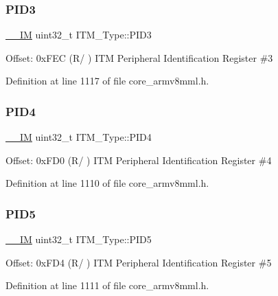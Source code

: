 \mbox{\label{struct_i_t_m___type_af317d5e2d946d70e6fb67c02b92cc8a3}} 
\subsubsection{\texorpdfstring{P\+I\+D3}{PID3}}
{\footnotesize\ttfamily \hyperlink{core__sc300_8h_a4cc1649793116d7c2d8afce7a4ffce43}{\+\_\+\+\_\+\+IM} uint32\+\_\+t I\+T\+M\+\_\+\+Type\+::\+P\+I\+D3}

Offset\+: 0x\+F\+EC (R/ ) I\+TM Peripheral Identification Register \#3 

Definition at line 1117 of file core\+\_\+armv8mml.\+h.

\mbox{\label{struct_i_t_m___type_aad5e11dd4baf6d941bd6c7450f60a158}} 
\subsubsection{\texorpdfstring{P\+I\+D4}{PID4}}
{\footnotesize\ttfamily \hyperlink{core__sc300_8h_a4cc1649793116d7c2d8afce7a4ffce43}{\+\_\+\+\_\+\+IM} uint32\+\_\+t I\+T\+M\+\_\+\+Type\+::\+P\+I\+D4}

Offset\+: 0x\+F\+D0 (R/ ) I\+TM Peripheral Identification Register \#4 

Definition at line 1110 of file core\+\_\+armv8mml.\+h.

\mbox{\label{struct_i_t_m___type_af9085648bf18f69b5f9d1136d45e1d37}} 
\subsubsection{\texorpdfstring{P\+I\+D5}{PID5}}
{\footnotesize\ttfamily \hyperlink{core__sc300_8h_a4cc1649793116d7c2d8afce7a4ffce43}{\+\_\+\+\_\+\+IM} uint32\+\_\+t I\+T\+M\+\_\+\+Type\+::\+P\+I\+D5}

Offset\+: 0x\+F\+D4 (R/ ) I\+TM Peripheral Identification Register \#5 

Definition at line 1111 of file core\+\_\+armv8mml.\+h.

